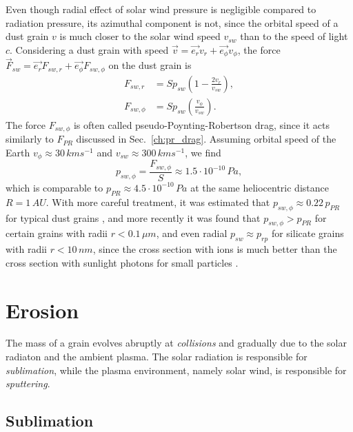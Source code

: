 Even though radial effect of solar wind pressure is negligible compared to radiation pressure, its azimuthal component is not, since the orbital speed of a dust grain $v$ is much closer to the solar wind speed $v_{sw}$ than to the speed of light $c$. Considering a dust grain with speed $\vec{v} = \vec{e_r}v_r + \vec{e_\phi}v_\phi$, the force $\vec{F}_{sw} = \vec{e_r}F_{sw,r} + \vec{e_\phi}F_{sw,\phi}$ on the dust grain is \citep{burns1979radiation}
\begin{equation}\begin{split}
    F_{sw,r} &= S p_{sw} \left( 1-\frac{2v_r}{v_{sw}} \right), \\
    F_{sw,\phi} &= S p_{sw} \left( \frac{v_\phi}{v_{sw}} \right).
\end{split}\end{equation}
The force $F_{sw,\phi}$ is often called pseudo-Poynting-Robertson drag, since it acts similarly to $F_{PR}$ discussed in Sec.~\ref{ch:pr_drag}. Assuming orbital speed of the Earth $v_\phi \approx 30 \, \si{km s^{-1}}$ and $v_{sw} \approx 300 \, \si{km s^{-1}}$, we find 
\begin{equation}
    p_{sw,\phi} = \frac{F_{sw,\phi}}{S} \approx 1.5 \cdot 10^{-10} \, \si{Pa},
\end{equation}
which is comparable to $p_{PR} \approx 4.5 \cdot 10^{-10} \, \si{Pa}$ at the same heliocentric distance $R = 1 \, \si{AU}$. With more careful treatment, it was estimated that $p_{sw,\phi} \approx 0.22 \, p_{PR}$ for typical dust grains \citep{whipple1967maintaining}, and more recently it was found that $p_{sw,\phi} > p_{PR}$ for certain grains with radii $r<0.1 \, \si{\mu m}$, and even radial $p_{sw} \approx p_{rp}$ for silicate grains with radii $r<10 \, \si{nm}$, since the cross section with ions is much better than the cross section with sunlight photons for small particles \citep{mukai1982solar}. 

\section{Erosion} \label{ch:erosion}

The mass of a grain evolves abruptly at \textit{collisions} and gradually due to the solar radiaton and the ambient plasma. The solar radiation is responsible for \textit{sublimation}, while the plasma environment, namely solar wind, is responsible for \textit{sputtering}. 

\subsection{Sublimation}

